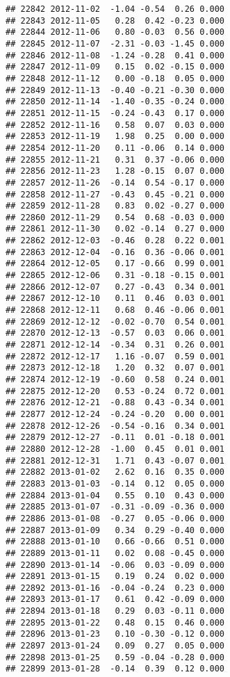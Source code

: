 \documentclass[
]{article}
\begin{document}
\begin{verbatim}
## 22842 2012-11-02  -1.04 -0.54  0.26 0.000
## 22843 2012-11-05   0.28  0.42 -0.23 0.000
## 22844 2012-11-06   0.80 -0.03  0.56 0.000
## 22845 2012-11-07  -2.31 -0.03 -1.45 0.000
## 22846 2012-11-08  -1.24 -0.28  0.41 0.000
## 22847 2012-11-09   0.15  0.02 -0.15 0.000
## 22848 2012-11-12   0.00 -0.18  0.05 0.000
## 22849 2012-11-13  -0.40 -0.21 -0.30 0.000
## 22850 2012-11-14  -1.40 -0.35 -0.24 0.000
## 22851 2012-11-15  -0.24 -0.43  0.17 0.000
## 22852 2012-11-16   0.58  0.07  0.03 0.000
## 22853 2012-11-19   1.98  0.25  0.00 0.000
## 22854 2012-11-20   0.11 -0.06  0.14 0.000
## 22855 2012-11-21   0.31  0.37 -0.06 0.000
## 22856 2012-11-23   1.28 -0.15  0.07 0.000
## 22857 2012-11-26  -0.14  0.54 -0.17 0.000
## 22858 2012-11-27  -0.43  0.45 -0.21 0.000
## 22859 2012-11-28   0.83  0.02 -0.27 0.000
## 22860 2012-11-29   0.54  0.68 -0.03 0.000
## 22861 2012-11-30   0.02 -0.14  0.27 0.000
## 22862 2012-12-03  -0.46  0.28  0.22 0.001
## 22863 2012-12-04  -0.16  0.36 -0.06 0.001
## 22864 2012-12-05   0.17 -0.66  0.99 0.001
## 22865 2012-12-06   0.31 -0.18 -0.15 0.001
## 22866 2012-12-07   0.27 -0.43  0.34 0.001
## 22867 2012-12-10   0.11  0.46  0.03 0.001
## 22868 2012-12-11   0.68  0.46 -0.06 0.001
## 22869 2012-12-12  -0.02 -0.70  0.54 0.001
## 22870 2012-12-13  -0.57  0.03  0.06 0.001
## 22871 2012-12-14  -0.34  0.31  0.26 0.001
## 22872 2012-12-17   1.16 -0.07  0.59 0.001
## 22873 2012-12-18   1.20  0.32  0.07 0.001
## 22874 2012-12-19  -0.60  0.58  0.24 0.001
## 22875 2012-12-20   0.53 -0.24  0.72 0.001
## 22876 2012-12-21  -0.88  0.43 -0.34 0.001
## 22877 2012-12-24  -0.24 -0.20  0.00 0.001
## 22878 2012-12-26  -0.54 -0.16  0.34 0.001
## 22879 2012-12-27  -0.11  0.01 -0.18 0.001
## 22880 2012-12-28  -1.00  0.45  0.01 0.001
## 22881 2012-12-31   1.71  0.43 -0.07 0.001
## 22882 2013-01-02   2.62  0.16  0.35 0.000
## 22883 2013-01-03  -0.14  0.12  0.05 0.000
## 22884 2013-01-04   0.55  0.10  0.43 0.000
## 22885 2013-01-07  -0.31 -0.09 -0.36 0.000
## 22886 2013-01-08  -0.27  0.05 -0.06 0.000
## 22887 2013-01-09   0.34  0.29 -0.40 0.000
## 22888 2013-01-10   0.66 -0.66  0.51 0.000
## 22889 2013-01-11   0.02  0.08 -0.45 0.000
## 22890 2013-01-14  -0.06  0.03 -0.09 0.000
## 22891 2013-01-15   0.19  0.24  0.02 0.000
## 22892 2013-01-16  -0.04 -0.24  0.23 0.000
## 22893 2013-01-17   0.61  0.42 -0.09 0.000
## 22894 2013-01-18   0.29  0.03 -0.11 0.000
## 22895 2013-01-22   0.48  0.15  0.46 0.000
## 22896 2013-01-23   0.10 -0.30 -0.12 0.000
## 22897 2013-01-24   0.09  0.27  0.05 0.000
## 22898 2013-01-25   0.59 -0.04 -0.28 0.000
## 22899 2013-01-28  -0.14  0.39  0.12 0.000

\end{verbatim}
\end{document}
